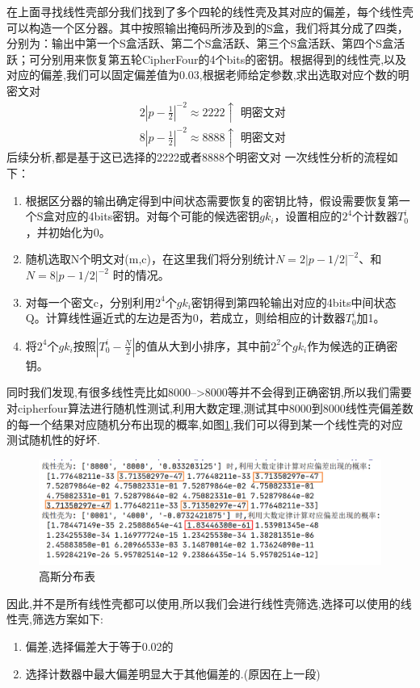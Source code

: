 \documentclass[UTF-8]{ctexart}
\begin{document}
在上面寻找线性壳部分我们找到了多个四轮的线性壳及其对应的偏差，每个线性壳可以构造一个区分器。其中按照输出掩码所涉及到的S盒，我们将其分成了四类，分别为：输出中第一个S盒活跃、第二个S盒活跃、第三个S盒活跃、第四个S盒活跃；可分别用来恢复第五轮CipherFour的4个bits的密钥。根据得到的线性壳,以及对应的偏差,我们可以固定偏差值为0.03,根据老师给定参数,求出选取对应个数的明密文对$$
\begin{aligned}
&2\left|p-\frac{1}{2}\right|^{-2} \approx 2222 \uparrow \text { 明密文对 }\\
&8\left|p-\frac{1}{2}\right|^{-2} \approx 8888 \uparrow \text { 明密文对 }
\end{aligned}
$$
后续分析,都是基于这已选择的2222或者8888个明密文对
一次线性分析的流程如下：
\begin{enumerate}
	\item 根据区分器的输出确定得到中间状态需要恢复的密钥比特，假设需要恢复第一个S盒对应的4bits密钥。对每个可能的候选密钥$gk_i$，设置相应的$2^4$个计数器$T_0^{i}$，并初始化为0。
	\item 随机选取N个明文对(m,c)，在这里我们将分别统计$N=2|p-1/2|^{-2}$、和$N=8|p-1/2|^{-2}$ 时的情况。
	\item 对每一个密文c，分别利用$2^{4}$个$gk_i$密钥得到第四轮输出对应的4bits中间状态Q。计算线性逼近式的左边是否为0，若成立，则给相应的计数器$T_0^{i}$加1。
	\item 将$2^4$个$gk_i$按照$|T_0^{i}-\frac{N}{2}|$的值从大到小排序，其中前$2^2$个$gk_i$作为候选的正确密钥。
\end{enumerate}
同时我们发现,有很多线性壳比如8000-->8000等并不会得到正确密钥,所以我们需要对cipherfour算法进行随机性测试,利用大数定理,测试其中8000到8000线性壳偏差数的每一个结果对应随机分布出现的概率,如图\cref{fig:gauss},我们可以得到某一个线性壳的对应测试随机性的好坏.
\begin{figure}[!htbp]
	\centering
	\includegraphics[width=0.8\linewidth]{Gauss}
	\caption{高斯分布表}
	\label{fig:gauss}
\end{figure}

因此,并不是所有线性壳都可以使用,所以我们会进行线性壳筛选,选择可以使用的线性壳,筛选方案如下:
\begin{enumerate}
	\item 
	偏差,选择偏差大于等于0.02的
	\item 选择计数器中最大偏差明显大于其他偏差的.(原因在上一段)
\end{enumerate}
\end{document}
